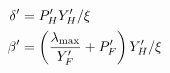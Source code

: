 \documentclass{pnastwo}
\begin{document}
\begin{article}
\begin{align}
  \delta^\prime &= P^\prime_{H}Y^\prime_{H}/\xi \\ \nonumber
  \beta^\prime &= \left(\frac{\lambda_{\rm max}}{Y^\prime_{F}}+P^\prime_{F} \right)Y^\prime_{H}/\xi
\end{align}















\end{article}
\end{document}
